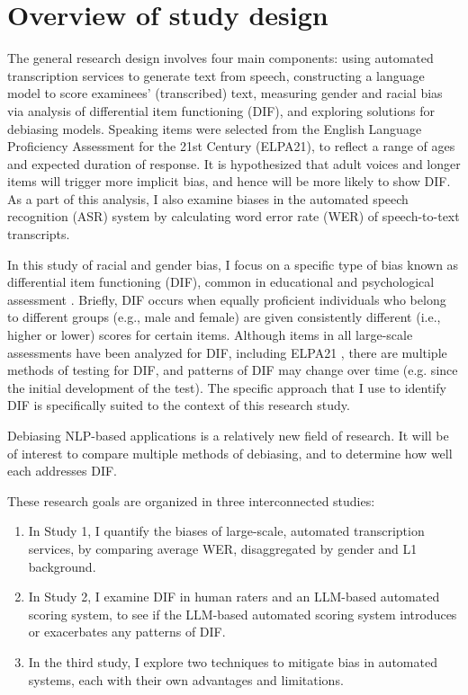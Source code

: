 \documentclass [PhD] {uclathes}
\begin{document}
\section{Overview of study design}

The general research design involves four main components: using automated transcription services to generate text from speech, constructing a language model to score examinees’ (transcribed) text, measuring gender and racial bias via analysis of differential item functioning (DIF), and exploring solutions for debiasing models. Speaking items were selected from the English Language Proficiency Assessment for the 21st Century (ELPA21), to reflect a range of ages and expected duration of response. It is hypothesized that adult voices and longer items will trigger more implicit bias, and hence will be more likely to show DIF. As a part of this analysis, I also examine biases in the automated speech recognition (ASR) system by calculating word error rate (WER) of speech-to-text transcripts. 

In this study of racial and gender bias, I focus on a specific type of bias known as differential item functioning (DIF), common in educational and psychological assessment \citep{aera2014}. Briefly, DIF occurs when equally proficient individuals who belong to different groups (e.g., male and female) are given consistently different (i.e., higher or lower) scores for certain items. Although items in all large-scale assessments have been analyzed for DIF, including ELPA21 \citep{anderson2015elpa21}, there are multiple methods of testing for DIF, and patterns of DIF may change over time (e.g. since the initial development of the test). The specific approach that I use to identify DIF is specifically suited to the context of this research study.

Debiasing NLP-based applications is a relatively new field of research. It will be of interest to compare multiple methods of debiasing, and to determine how well each addresses DIF.

These research goals are organized in three interconnected studies: 

\begin{enumerate}
    \item In Study 1, I quantify the biases of large-scale, automated transcription services, by comparing average WER, disaggregated by gender and L1 background.
    \item In Study 2, I examine DIF in human raters and an LLM-based automated scoring system, to see if the LLM-based automated scoring system introduces or exacerbates any patterns of DIF. 
    \item In the third study, I explore two techniques to mitigate bias in automated systems, each with their own advantages and limitations.
\end{enumerate}
\end{document}
